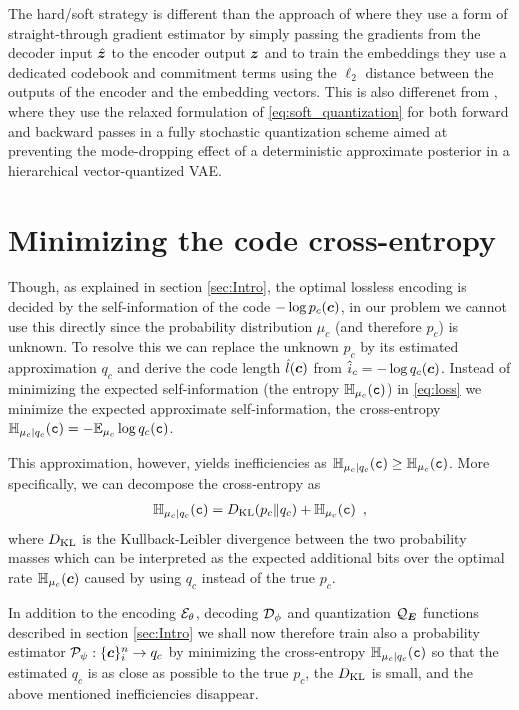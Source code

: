\documentclass{article} %
\renewcommand{\rvc}{\mathtt{c}}
\newcommand{\pc}{p_c}
\newcommand{\qc}{q_c}
\newcommand{\muc}{\mu_c}
\newcommand{\Hc}{\sH_{\muc}}
\newcommand{\cHc}{\sH_{\muc|\qc}}
\newcommand{\gEt}{\gE_\theta}
\newcommand{\gQE}{\gQ_\mE}
\newcommand{\gDp}{\gD_\phi}
\newcommand{\vzh}{\hat{\vz}}
\newcommand{\gPp}{\gP_{\psi}}
\begin{document}
The hard/soft strategy is different than the approach of \citet{oordNeuralDiscreteRepresentation2017} where they use a form of straight-through gradient estimator by simply passing the gradients from the decoder input $\vzh$ to the encoder output ${\bm{z}}$ and to train the embeddings they use a dedicated codebook and commitment terms using the $\ell_2$ distance between the outputs of the encoder and the embedding vectors.
This is also differenet from \citet{williamsHierarchicalQuantizedAutoencoders2020}, where they use the relaxed formulation of \eqref{eq:soft_quantization} for both forward and backward passes in a fully stochastic quantization scheme aimed at preventing the mode-dropping effect of a deterministic approximate posterior in a hierarchical vector-quantized VAE.


\section{Minimizing the code cross-entropy}

Though, as explained in section \ref{sec:Intro}, the optimal lossless encoding is decided by the self-information of the code $-\log \pc(\vc)$, in our problem we cannot use this directly since the probability distribution $\muc$ (and therefore $\pc$) is unknown.
To resolve this we can replace the unknown $\pc$ by its estimated approximation
$\qc$ and derive the code length $\hat{l}({\bm{c}})$ from $\hat{i}_c = - \log \qc(\vc)$. 
Instead of minimizing the expected self-information (the entropy $\Hc(\rvc)$) in \eqref{eq:loss} we minimize the expected approximate self-information, the cross-entropy $\cHc(\rvc) = - \E_{\muc} \log \qc(\rvc)$.

This approximation, however, yields inefficiencies as $\cHc(\rvc) \geq \Hc(\rvc)$.
More specifically, we can decompose the cross-entropy as
\begin{align}\label{eq:crossentropy_KL}
\cHc(\rvc) = \KL(\pc \Vert \qc) + \Hc(\rvc) \enspace ,
\end{align}
where $D_{\mathrm{KL}}$ is the Kullback-Leibler divergence between the two probability masses which can be interpreted as the expected additional bits over the optimal rate $\Hc(\vc)$ caused by using $\qc$ instead of the true $\pc$.

In addition to the encoding $\gEt$, decoding $\gDp$ and quantization $\gQE$ functions described in section \ref{sec:Intro} we shall now therefore train also a probability estimator $\gPp : \{\vc\}_i^n \to \qc$ by minimizing the cross-entropy $\cHc(\rvc)$ so that the estimated $\qc$ is as close as possible to the true $\pc$, the $D_{\mathrm{KL}}$ is small, and the above mentioned inefficiencies disappear.
\end{document}
